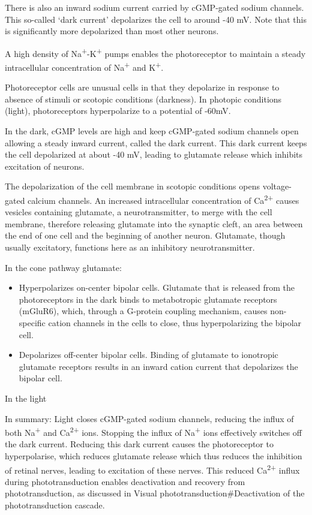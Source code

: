 \documentclass[]{book}
\providecommand{\tightlist}{%
  \setlength{\itemsep}{0pt}\setlength{\parskip}{0pt}}
\begin{document}
There is also an inward sodium current carried by cGMP-gated sodium channels. This so-called `dark current' depolarizes the cell to around -40 mV. Note that this is significantly more depolarized than most other neurons.

A high density of Na\textsuperscript{+}-K\textsuperscript{+} pumps enables the photoreceptor to maintain a steady intracellular concentration of Na\textsuperscript{+} and K\textsuperscript{+}.

Photoreceptor cells are unusual cells in that they depolarize in response to absence of stimuli or scotopic conditions (darkness). In photopic conditions (light), photoreceptors hyperpolarize to a potential of -60mV.

In the dark, cGMP levels are high and keep cGMP-gated sodium channels open allowing a steady inward current, called the dark current. This dark current keeps the cell depolarized at about -40 mV, leading to glutamate release which inhibits excitation of neurons.

The depolarization of the cell membrane in scotopic conditions opens voltage-gated calcium channels. An increased intracellular concentration of Ca\textsuperscript{2+} causes vesicles containing glutamate, a neurotransmitter, to merge with the cell membrane, therefore releasing glutamate into the synaptic cleft, an area between the end of one cell and the beginning of another neuron. Glutamate, though usually excitatory, functions here as an inhibitory neurotransmitter.

In the cone pathway glutamate:

\begin{itemize}
\tightlist
\item
  Hyperpolarizes on-center bipolar cells. Glutamate that is released from the photoreceptors in the dark binds to metabotropic glutamate receptors (mGluR6), which, through a G-protein coupling mechanism, causes non-specific cation channels in the cells to close, thus hyperpolarizing the bipolar cell.
\item
  Depolarizes off-center bipolar cells. Binding of glutamate to ionotropic glutamate receptors results in an inward cation current that depolarizes the bipolar cell.
\end{itemize}

In the light

In summary: Light closes cGMP-gated sodium channels, reducing the influx of both Na\textsuperscript{+} and Ca\textsuperscript{2+} ions. Stopping the influx of Na\textsuperscript{+} ions effectively switches off the dark current. Reducing this dark current causes the photoreceptor to hyperpolarise, which reduces glutamate release which thus reduces the inhibition of retinal nerves, leading to excitation of these nerves. This reduced Ca\textsuperscript{2+} influx during phototransduction enables deactivation and recovery from phototransduction, as discussed in Visual phototransduction\#Deactivation of the phototransduction cascade.
\end{document}
